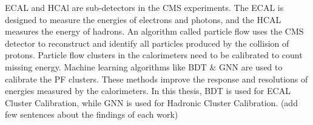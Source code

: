 

ECAL and HCAl are sub-detectors in the CMS experiments.
The ECAL is designed to measure the energies of electrons and photons, and the HCAL measures the energy of hadrons.
An algorithm called particle flow uses the CMS detector to reconstruct and identify all particles produced by the collision of protons.
Particle flow clusters in the calorimeters need to be calibrated to count missing energy.
Machine learning algorithms like BDT \& GNN are used to calibrate the PF clusters.
These methods improve the response and resolutions of energies measured by the calorimeters.
In this thesis, BDT is used for ECAL Cluster Calibration, while GNN is used for Hadronic Cluster Calibration. 
(add few sentences about the findings of each work) 















    

    
    

